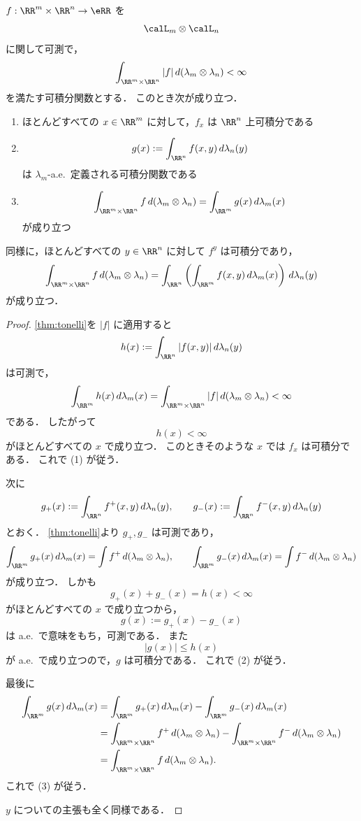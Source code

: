 \begin{theorem}[Fubiniの定理]\label{thm:fubini}
$f:\RR^m\times\RR^n\to\eRR$ を
\[
\calL_m\otimes\calL_n
\]
に関して可測で，
\[
\int_{\RR^m\times\RR^n}|f|\,d(\lambda_m\otimes\lambda_n)<\infty
\]
を満たす可積分関数とする．
このとき次が成り立つ．
\begin{enumerate}
    \item ほとんどすべての $x\in\RR^m$ に対して，$f_x$ は $\RR^n$ 上可積分である
    \item
    \[
    g(x):=\int_{\RR^n}f(x,y)\,d\lambda_n(y)
    \]
    は $\lambda_m$-a.e.\ 定義される可積分関数である
    \item
    \[
    \int_{\RR^m\times\RR^n}f\,d(\lambda_m\otimes\lambda_n)
    =
    \int_{\RR^m}g(x)\,d\lambda_m(x)
    \]
    が成り立つ
\end{enumerate}
同様に，ほとんどすべての $y\in\RR^n$ に対して $f^y$ は可積分であり，
\[
\int_{\RR^m\times\RR^n}f\,d(\lambda_m\otimes\lambda_n)
=
\int_{\RR^n}\left(\int_{\RR^m}f(x,y)\,d\lambda_m(x)\right)\,d\lambda_n(y)
\]
が成り立つ．
\end{theorem}
\begin{proof}
\cref{thm:tonelli}を $|f|$ に適用すると
\[
h(x):=\int_{\RR^n}|f(x,y)|\,d\lambda_n(y)
\]
は可測で，
\[
\int_{\RR^m}h(x)\,d\lambda_m(x)
=
\int_{\RR^m\times\RR^n}|f|\,d(\lambda_m\otimes\lambda_n)
<
\infty
\]
である．
したがって
\[
h(x)<\infty
\]
がほとんどすべての $x$ で成り立つ．
このときそのような $x$ では $f_x$ は可積分である．
これで (1) が従う．

次に
\[
g_+(x):=\int_{\RR^n}f^+(x,y)\,d\lambda_n(y),
\qquad
g_-(x):=\int_{\RR^n}f^-(x,y)\,d\lambda_n(y)
\]
とおく．
\cref{thm:tonelli}より $g_+,g_-$ は可測であり，
\[
\int_{\RR^m}g_+(x)\,d\lambda_m(x)=\int f^+\,d(\lambda_m\otimes\lambda_n),
\qquad
\int_{\RR^m}g_-(x)\,d\lambda_m(x)=\int f^-\,d(\lambda_m\otimes\lambda_n)
\]
が成り立つ．
しかも
\[
g_+(x)+g_-(x)=h(x)<\infty
\]
がほとんどすべての $x$ で成り立つから，
\[
g(x):=g_+(x)-g_-(x)
\]
は a.e.\ で意味をもち，可測である．
また
\[
|g(x)|\le h(x)
\]
が a.e.\ で成り立つので，$g$ は可積分である．
これで (2) が従う．

最後に
\begin{align*}
\int_{\RR^m}g(x)\,d\lambda_m(x)
&=
\int_{\RR^m}g_+(x)\,d\lambda_m(x)-\int_{\RR^m}g_-(x)\,d\lambda_m(x) \\
&=
\int_{\RR^m\times\RR^n}f^+\,d(\lambda_m\otimes\lambda_n)
-\int_{\RR^m\times\RR^n}f^-\,d(\lambda_m\otimes\lambda_n) \\
&=
\int_{\RR^m\times\RR^n}f\,d(\lambda_m\otimes\lambda_n).
\end{align*}
これで (3) が従う．

$y$ についての主張も全く同様である．
\end{proof}

